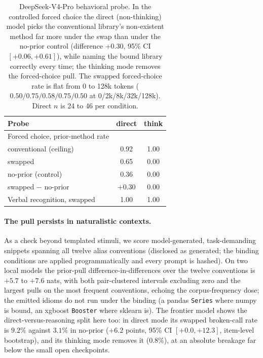 \documentclass[11pt]{article}
\begin{document}
\begin{table}[t]
\centering
\small
\begin{tabular}{lcc}
\toprule
\textbf{Probe} & \textbf{direct} & \textbf{think} \\
\midrule
Forced choice, prior-method rate & & \\
\quad conventional (ceiling) & 0.92 & 1.00 \\
\quad swapped & 0.65 & 0.00 \\
\quad no-prior (control) & 0.36 & 0.00 \\
\quad swapped $-$ no-prior & $+0.30$ & $0.00$ \\
Verbal recognition, swapped & 1.00 & 1.00 \\
\bottomrule
\end{tabular}
\caption{DeepSeek-V4-Pro behavioral probe. In the controlled forced choice the direct (non-thinking) model picks the conventional library's non-existent method far more under the swap than under the no-prior control (difference $+0.30$, 95\% CI $[+0.06, +0.61]$), while naming the bound library correctly every time; the thinking mode removes the forced-choice pull. The swapped forced-choice rate is flat from 0 to 128k tokens ($0.50/0.75/0.58/0.75/0.50$ at 0/2k/8k/32k/128k). Direct $n$ is 24 to 46 per condition.}
\label{tab:deepseek}
\end{table}

\paragraph{The pull persists in naturalistic contexts.} As a check beyond templated stimuli, we score model-generated, task-demanding snippets spanning all twelve alias conventions (disclosed as generated; the binding conditions are applied programmatically and every prompt is hashed). On two local models the prior-pull difference-in-differences over the twelve conventions is $+5.7$ to $+7.6$ nats, with both pair-clustered intervals excluding zero and the largest pulls on the most frequent conventions, echoing the corpus-frequency dose; the emitted idioms do not run under the binding (a pandas \texttt{Series} where numpy is bound, an xgboost \texttt{Booster} where sklearn is). The frontier model shows the direct-versus-reasoning split here too: in direct mode its swapped broken-call rate is $9.2\%$ against $3.1\%$ in no-prior ($+6.2$ points, 95\% CI $[+0.0, +12.3]$, item-level bootstrap), and its thinking mode removes it ($0.8\%$), at an absolute breakage far below the small open checkpoints.
\end{document}
